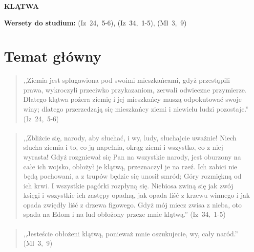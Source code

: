 \documentclass[10pt,a4paper,oneside]{article}
\begin{document}
\centerline{\textbf{\MakeUppercase{Klątwa}}}
\begin{center}
\textbf{Wersety do studium:} \mbox{(Iz 24, 5-6)}, \mbox{(Iz 34, 1-5)}, \mbox{(Ml 3, 9)}
\end{center}
\section{Temat główny}
\paragraph{}
\begin{quote}
,,Ziemia jest splugawiona pod swoimi mieszkańcami, gdyż przestąpili prawa, wykroczyli przeciwko przykazaniom, zerwali odwieczne przymierze. Dlatego klątwa pożera ziemię i jej mieszkańcy muszą odpokutować swoje winy; dlatego przerzedzają się mieszkańcy ziemi i niewielu ludzi pozostaje.'' \mbox{(Iz 24, 5-6)}
\end{quote}
\paragraph{}
\begin{quote}
,,Zbliżcie się, narody, aby słuchać, i wy, ludy, słuchajcie uważnie! Niech słucha ziemia i to, co ją napełnia, okrąg ziemi i wszystko, co z niej wyrasta! Gdyż rozgniewał się Pan na wszystkie narody, jest oburzony na całe ich wojsko, obłożył je klątwą, przeznaczył je na rzeź. Ich zabici nie będą pochowani, a z trupów będzie się unosił smród; Góry rozmiękną od ich krwi. I wszystkie pagórki rozpłyną się. Niebiosa zwiną się jak zwój księgi i wszystkie ich zastępy opadną, jak opada liść z krzewu winnego i jak opada zwiędły liść z drzewa figowego. Gdyż mój miecz zwisa z nieba, oto spada na Edom i na lud obłożony przeze mnie klątwą.'' \mbox{(Iz 34, 1-5)}
\end{quote}
\paragraph{}
\begin{quote}
,,Jesteście obłożeni klątwą, ponieważ mnie oszukujecie, wy, cały naród.'' \mbox{(Ml 3, 9)}
\end{quote}
\end{document}
